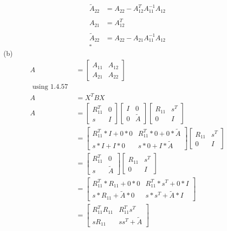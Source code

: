 \documentclass{article}
\begin{document}
	\begin{align*}
		\tilde{A}_{22} &= A_{22} - A_{12}^{T}A_{11}^{-1}A_{12}\\
		\\
		A_{21} &= A_{12}^T\\
		\\
		\tilde{A}_{22} &= A_{22} - A_{21}A_{11}^{-1}A_{12}\\
		\square
	\end{align*}
	(b)\\
	\begin{align*}
	A &= \begin{bmatrix}A_{11} & A_{12}\\A_{21}&A_{22}\end{bmatrix}\\
	\text{ using 1.4.57 }\\
	A&=X^TBX\\
	A&=\begin{bmatrix}R_{11}^T&0\\s&I\end{bmatrix}\begin{bmatrix}I&0\\0&\tilde{A}\end{bmatrix}\begin{bmatrix}R_{11}&s^T\\0&I\end{bmatrix}\\	
	&=\begin{bmatrix}R_{11}^T*I+0*0&R_{11}^T*0+0*\tilde{A}\\s*I+I*0&s*0+I*\tilde{A}\end{bmatrix}\begin{bmatrix}R_{11}&s^T\\0&I\end{bmatrix}\\
	&=\begin{bmatrix}R_{11}^T&0\\s&\tilde{A}\end{bmatrix}\begin{bmatrix}R_{11}&s^T\\0&I\end{bmatrix}\\	
	&=\begin{bmatrix}R_{11}^T*R_{11}+0*0&R_{11}^T*s^T+0*I\\s*R_{11}+\tilde{A}*0&s*s^T+\tilde{A}*I\end{bmatrix}\\
	&=\begin{bmatrix}R_{11}^TR_{11}&R_{11}^Ts^T\\sR_{11}&ss^T+\tilde{A}\end{bmatrix}\\
	\end{align*}
\end{document}
